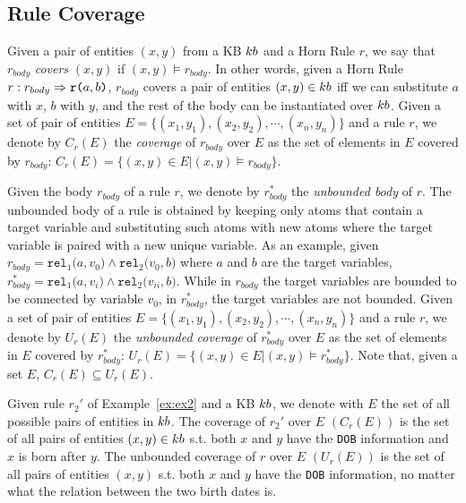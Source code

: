 \vspace{-1ex}
\subsection{Rule Coverage}
\vspace{-1ex}
Given a pair of entities $(x,y)$ from a KB ${\sc kb}$ and a Horn Rule $r$, we say that $r_{body}$ \emph{covers} $(x,y)$ if
$(x,y) \models r_{body}$. In other words, given a Horn Rule $r : r_{body} \Rightarrow \texttt{r(}a,b\texttt{)}$, $r_{body}$ covers a pair of entities $(x,y) \in {\sc kb}$ iff we can substitute $a$ with $x$, $b$ with $y$, and the rest of the body can be instantiated over ${\sc kb}$. Given a set of pair of entities $E = \{(x_1,y_1),(x_2,y_2),\cdots,(x_n,y_n)\}$ and a rule $r$, we denote by $C_r(E)$ the \emph{coverage} of $r_{body}$ over $E$ as the set of elements in $E$ covered by $r_{body}$: $C_r(E)=\{(x,y) \in E | (x,y) \models r_{body}\}$.

Given the body $r_{body}$ of a rule $r$, we denote by $r^{*}_{body}$ the \emph{unbounded body} of $r$. The unbounded body of a rule is obtained by keeping only atoms that contain a target variable and substituting such atoms with new atoms where the target variable is paired with a new unique variable. As an example, given $r_{body} = \texttt{rel}_1\texttt{(}a,v_0\texttt{)} \wedge \texttt{rel}_2\texttt{(}v_0,b\texttt{)}$ where $a$ and $b$ are the target variables, $r^{*}_{body} = \texttt{rel}_1\texttt{(}a,v_i\texttt{)} \wedge \texttt{rel}_2\texttt{(}v_{ii},b\texttt{)}$.
While in $r_{body}$ the target variables are bounded to be connected by variable $v_0$, in $r^{*}_{body}$, the target variables are not bounded.
Given a set of pair of entities $E = \{(x_1,y_1),(x_2,y_2),\cdots,(x_n,y_n)\}$ and a rule $r$, we denote by $U_r(E)$ the \emph{unbounded coverage} of $r^{*}_{body}$ over $E$ as the set of elements in $E$ covered by $r^{*}_{body}$: $U_r(E)=\{(x,y) \in E | (x,y) \models r^{*}_{body}\}$. Note that, given a set $E$, $C_r(E) \subseteq U_r(E)$. 

\begin{example}
	Given rule $r_2'$ of Example~\ref{ex:ex2} and a KB ${\sc kb}$, we denote with $E$ the set of all possible pairs of entities in ${\sc kb}$. The coverage of $r_2'$ over $E$ $(C_r(E))$ is the set of all pairs of entities $(x,y) \in {\sc kb}$ s.t. both $x$ and $y$ have the \texttt{DOB} information and $x$ is born after $y$. The unbounded coverage of $r$ over $E$ $(U_r(E))$ is the set of all pairs of entities $(x,y)$ s.t. both $x$ and $y$ have the \texttt{DOB} information, no matter what the relation between the two birth dates is. 
\end{example} 

